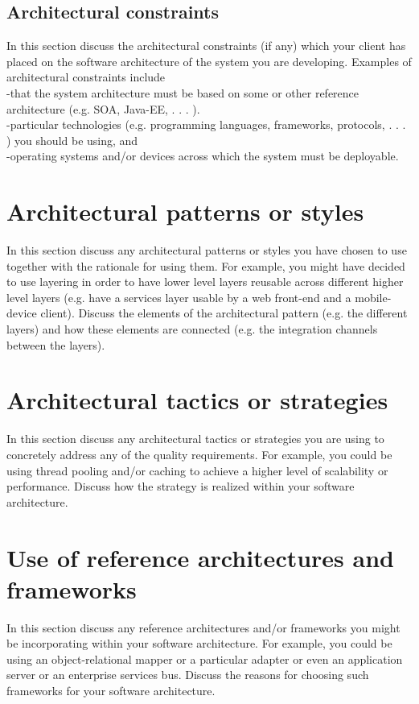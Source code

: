 \documentclass[11pt,titlepage]{article} %
\begin{document}
\subsection{Architectural constraints}
In this section discuss the architectural constraints (if any) which your client has placed on the
software architecture of the system you are developing. Examples of architectural constraints include
\\-that the system architecture must be based on some or other reference architecture (e.g. SOA,
Java-EE, . . . ).
\\-particular technologies (e.g. programming languages, frameworks, protocols, . . . ) you should
be using, and
\\-operating systems and/or devices across which the system must be deployable.

\section{Architectural patterns or styles}
In this section discuss any architectural patterns or styles you have chosen to use together with the
rationale for using them.
For example, you might have decided to use layering in order to have lower level layers reusable
across different higher level layers (e.g. have a services layer usable by a web front-end and a
mobile-device client).
Discuss the elements of the architectural pattern (e.g. the different layers) and how these elements are connected (e.g. the integration channels between the layers).

\section{Architectural tactics or strategies}
In this section discuss any architectural tactics or strategies you are using to concretely address any
of the quality requirements.
For example, you could be using thread pooling and/or caching to achieve a higher level of
scalability or performance.
Discuss how the strategy is realized within your software architecture.

\section{Use of reference architectures and frameworks}
In this section discuss any reference architectures and/or frameworks you might be incorporating
within your software architecture. For example, you could be using an object-relational mapper or
a particular adapter or even an application server or an enterprise services bus.
Discuss the reasons for choosing such frameworks for your software architecture.
\end{document}
